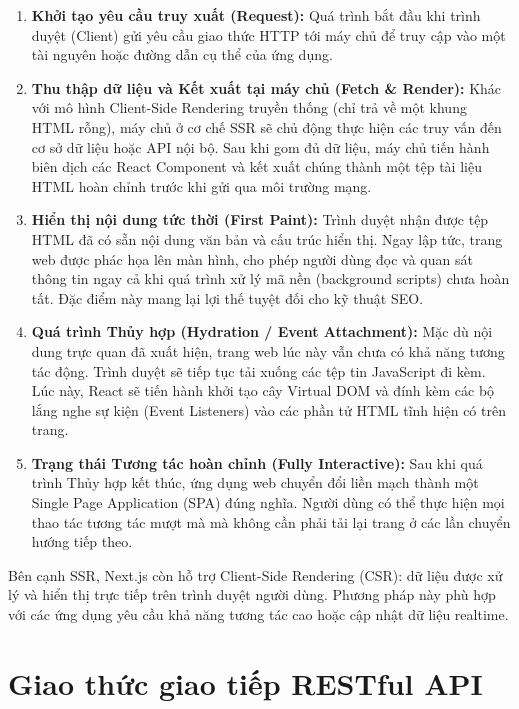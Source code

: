 \documentclass[../main.tex]{subfiles}
\begin{document}
\begin{enumerate}
    \item \textbf{Khởi tạo yêu cầu truy xuất (Request):} Quá trình bắt đầu khi trình duyệt (Client) gửi yêu cầu giao thức HTTP tới máy chủ để truy cập vào một tài nguyên hoặc đường dẫn cụ thể của ứng dụng.
    \item \textbf{Thu thập dữ liệu và Kết xuất tại máy chủ (Fetch \& Render):} Khác với mô hình Client-Side Rendering truyền thống (chỉ trả về một khung HTML rỗng), máy chủ ở cơ chế SSR sẽ chủ động thực hiện các truy vấn đến cơ sở dữ liệu hoặc API nội bộ. Sau khi gom đủ dữ liệu, máy chủ tiến hành biên dịch các React Component và kết xuất chúng thành một tệp tài liệu HTML hoàn chỉnh trước khi gửi qua môi trường mạng.
    \item \textbf{Hiển thị nội dung tức thời (First Paint):} Trình duyệt nhận được tệp HTML đã có sẵn nội dung văn bản và cấu trúc hiển thị. Ngay lập tức, trang web được phác họa lên màn hình, cho phép người dùng đọc và quan sát thông tin ngay cả khi quá trình xử lý mã nền (background scripts) chưa hoàn tất. Đặc điểm này mang lại lợi thế tuyệt đối cho kỹ thuật SEO.
    \item \textbf{Quá trình Thủy hợp (Hydration / Event Attachment):} Mặc dù nội dung trực quan đã xuất hiện, trang web lúc này vẫn chưa có khả năng tương tác động. Trình duyệt sẽ tiếp tục tải xuống các tệp tin JavaScript đi kèm. Lúc này, React sẽ tiến hành khởi tạo cây Virtual DOM và đính kèm các bộ lắng nghe sự kiện (Event Listeners) vào các phần tử HTML tĩnh hiện có trên trang.
    \item \textbf{Trạng thái Tương tác hoàn chỉnh (Fully Interactive):} Sau khi quá trình Thủy hợp kết thúc, ứng dụng web chuyển đổi liền mạch thành một Single Page Application (SPA) đúng nghĩa. Người dùng có thể thực hiện mọi thao tác tương tác mượt mà mà không cần phải tải lại trang ở các lần chuyển hướng tiếp theo.
\end{enumerate}

Bên cạnh SSR, Next.js còn hỗ trợ Client-Side Rendering (CSR): dữ liệu được xử lý và hiển thị trực tiếp trên trình duyệt người dùng. Phương pháp này phù hợp với các ứng dụng yêu cầu khả năng tương tác cao hoặc cập nhật dữ liệu realtime.

\section{Giao thức giao tiếp RESTful API}
\end{document}
